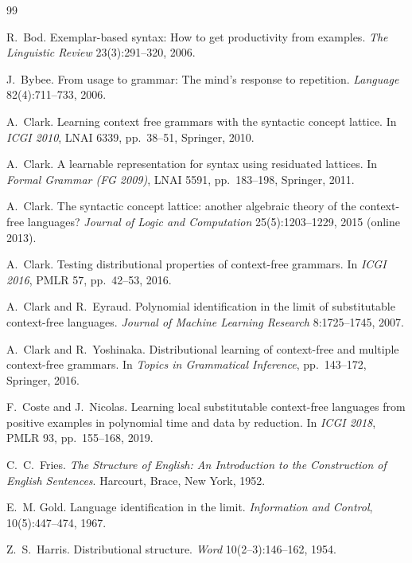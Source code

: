 \documentclass[11pt]{article}
\numberwithin{equation}{section}
\theoremstyle{plain}
\theoremstyle{definition}
\theoremstyle{remark}
\theoremstyle{plain}
\begin{document}
\begin{thebibliography}{99}

R.~Bod.
Exemplar-based syntax: How to get productivity from examples.
\textit{The Linguistic Review} 23(3):291--320, 2006.

J.~Bybee.
From usage to grammar: The mind's response to repetition.
\textit{Language} 82(4):711--733, 2006.

A.~Clark.
Learning context free grammars with the syntactic concept lattice.
In \textit{ICGI 2010}, LNAI 6339, pp.~38--51, Springer, 2010.

A.~Clark.
A learnable representation for syntax using residuated lattices.
In \textit{Formal Grammar (FG 2009)}, LNAI 5591, pp.~183--198, Springer,
2011.

A.~Clark.
The syntactic concept lattice: another algebraic theory of the
context-free languages?
\textit{Journal of Logic and Computation} 25(5):1203--1229, 2015
(online 2013).

A.~Clark.
Testing distributional properties of context-free grammars.
In \textit{ICGI 2016}, PMLR 57, pp.~42--53, 2016.

A.~Clark and R.~Eyraud.
Polynomial identification in the limit of substitutable context-free
languages.
\textit{Journal of Machine Learning Research} 8:1725--1745, 2007.

A.~Clark and R.~Yoshinaka.
Distributional learning of context-free and multiple context-free
grammars.
In \textit{Topics in Grammatical Inference}, pp.~143--172, Springer, 2016.

F.~Coste and J.~Nicolas.
Learning local substitutable context-free languages from positive examples
in polynomial time and data by reduction.
In \textit{ICGI 2018}, PMLR 93, pp.~155--168, 2019.

C.~C.~Fries.
\textit{The Structure of English: An Introduction to the Construction of
English Sentences}.
Harcourt, Brace, New York, 1952.

E.~M. Gold.
Language identification in the limit.
\textit{Information and Control}, 10(5):447--474, 1967.

Z.~S.~Harris.
Distributional structure.
\textit{Word} 10(2--3):146--162, 1954.


\end{thebibliography}
\end{document}
